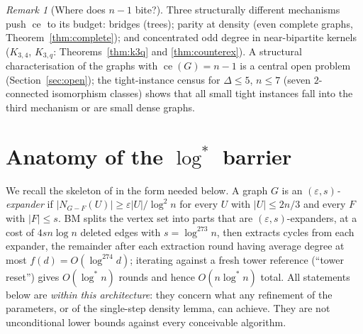 \documentclass[a4paper,11pt]{amsart}
\theoremstyle{definition}
\theoremstyle{remark}
\newtheorem{remark}[theorem]{Remark}
\newcommand{\ce}{\operatorname{ce}}
\begin{document}
\begin{remark}[Where does $n-1$ bite?]\label{rem:bite}
Three structurally different mechanisms push $\ce$ to its budget: bridges (trees); parity at density (even
complete graphs, Theorem~\ref{thm:complete}); and concentrated odd degree in near-bipartite kernels
($K_{3,4}$, $K_{3,q}$: Theorems~\ref{thm:k3q} and \ref{thm:counterex}). A structural characterisation of
the graphs with $\ce(G)=n-1$ is a central open problem (Section~\ref{sec:open}); the tight-instance census
for $\Delta\le5$, $n\le7$ (seven $2$-connected isomorphism classes) shows that all small tight instances
fall into the third mechanism or are small dense graphs.
\end{remark}

\section{Anatomy of the $\log^*$ barrier}\label{sec:bm}

We recall the skeleton of \cite{BM22} in the form needed below. A graph $G$ is an
\emph{$(\varepsilon,s)$-expander} if $|N_{G-F}(U)|\ge\varepsilon|U|/\log^2 n$ for every $U$ with
$|U|\le 2n/3$ and every $F$ with $|F|\le s$. BM splits the vertex set into parts that are
$(\varepsilon,s)$-expanders, at a cost of $4sn\log n$ deleted edges with $s=\log^{273}n$, then extracts
cycles from each expander, the remainder after each extraction round having average degree at most
$f(d)=O(\log^{274}d)$; iterating against a fresh tower reference (``tower reset'') gives $O(\log^* n)$
rounds and hence $O(n\log^* n)$ total. All statements below are \emph{within this architecture}: they
concern what any refinement of the parameters, or of the single-step density lemma, can achieve. They are
not unconditional lower bounds against every conceivable algorithm.
\end{document}
